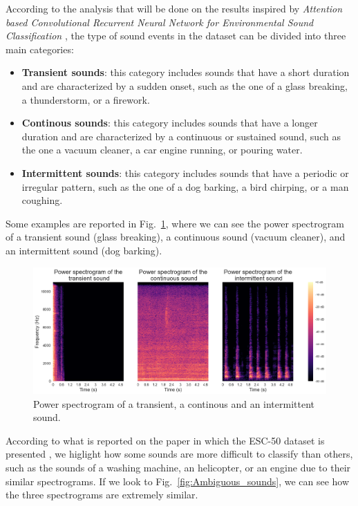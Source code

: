 \documentclass{article}
\begin{document}
\begin{sloppy}
According to the analysis that will be done on the results inspired by \textit{Attention based Convolutional Recurrent Neural Network for Environmental Sound Classification} \cite{zhang2019attentionbasedconvolutionalrecurrent},
the type of sound events in the dataset can be divided into three main categories:
\begin{itemize}
    \item \textbf{Transient sounds}: this category includes sounds that have a short duration and are characterized by a sudden onset, such as the one of a glass breaking, a thunderstorm, or a firework.
    \item \textbf{Continous sounds}: this category includes sounds that have a longer duration and are characterized by a continuous or sustained sound, such as the one a vacuum cleaner, a car engine running, or pouring water.
    \item \textbf{Intermittent sounds}: this category includes sounds that have a periodic or irregular pattern, such as the one of a dog barking, a bird chirping, or a man coughing.
\end{itemize}
Some examples are reported in Fig.~\ref{fig:power_spectrograms_3_sounds}, where we can see the power spectrogram of a transient sound (glass breaking), a continuous sound (vacuum cleaner), and an intermittent sound (dog barking).

\begin{figure}[ht]
  \centering
  \centerline{\includegraphics[width=\columnwidth]{Three_types_of_sound.png}}
  \caption{Power spectrogram of a transient, a continous and an intermittent sound.}
  \label{fig:power_spectrograms_3_sounds}
\end{figure}

According to what is reported on the paper in which the ESC-50 dataset is presented \cite{piczak2015dataset}, we higlight how some sounds are more difficult to classify than others,
such as the sounds of a washing machine, an helicopter, or an engine due to their similar spectrograms. If we look to Fig.~\ref{fig:Ambiguous_sounds}, we can see how the three spectrograms
are extremely similar.


\end{sloppy}
\end{document}
